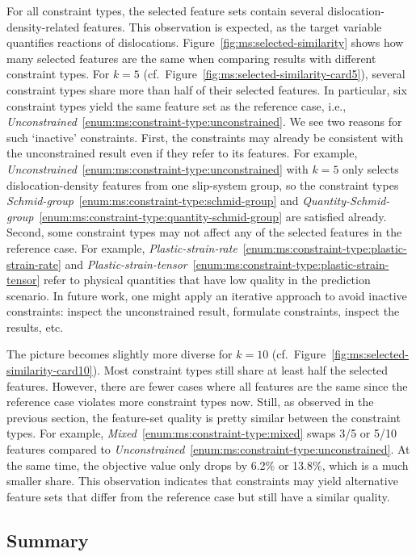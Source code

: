 For all constraint types, the selected feature sets contain several dislocation-density-related features.
This observation is expected, as the target variable quantifies reactions of dislocations.
Figure~\ref{fig:ms:selected-similarity} shows how many selected features are the same when comparing results with different constraint types.
For $k=5$ (cf.~Figure~\ref{fig:ms:selected-similarity-card5}), several constraint types share more than half of their selected features.
In particular, six constraint types yield the same feature set as the reference case, i.e., \emph{Unconstrained}~\ref{enum:ms:constraint-type:unconstrained}.
We see two reasons for such `inactive' constraints.
First, the constraints may already be consistent with the unconstrained result even if they refer to its features.
For example, \emph{Unconstrained}~\ref{enum:ms:constraint-type:unconstrained} with $k=5$ only selects dislocation-density features from one slip-system group, so the constraint types \emph{Schmid-group}~\ref{enum:ms:constraint-type:schmid-group} and \emph{Quantity-Schmid-group}~\ref{enum:ms:constraint-type:quantity-schmid-group} are satisfied already.
Second, some constraint types may not affect any of the selected features in the reference case.
For example, \emph{Plastic-strain-rate}~\ref{enum:ms:constraint-type:plastic-strain-rate} and \emph{Plastic-strain-tensor}~\ref{enum:ms:constraint-type:plastic-strain-tensor} refer to physical quantities that have low quality in the prediction scenario. 
In future work, one might apply an iterative approach to avoid inactive constraints:
inspect the unconstrained result, formulate constraints, inspect the results, etc.

The picture becomes slightly more diverse for $k=10$ (cf.~Figure~\ref{fig:ms:selected-similarity-card10}).
Most constraint types still share at least half the selected features.
However, there are fewer cases where all features are the same since the reference case violates more constraint types now.
Still, as observed in the previous section, the feature-set quality is pretty similar between the constraint types.
For example, \emph{Mixed}~\ref{enum:ms:constraint-type:mixed} swaps 3/5 or 5/10 features compared to \emph{Unconstrained}~\ref{enum:ms:constraint-type:unconstrained}.
At the same time, the objective value only drops by 6.2\% or 13.8\%, which is a much smaller share.
This observation indicates that constraints may yield alternative feature sets that differ from the reference case but still have a similar quality.

\subsection{Summary}
\label{sec:ms:evaluation:summary}

